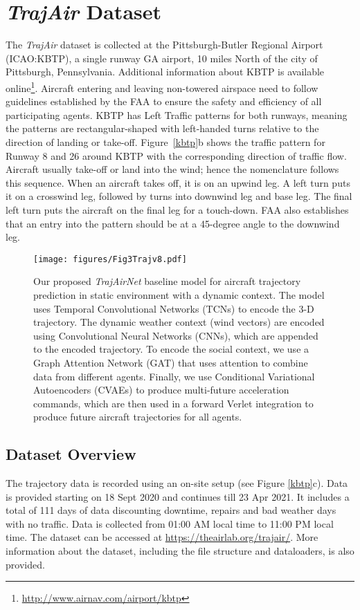 \documentclass[letterpaper, 10 pt, conference]{ieeeconf}
\begin{document}
\section{\textit{TrajAir} Dataset}\label{sec:trajair}




The \textit{TrajAir} dataset is collected at the Pittsburgh-Butler Regional Airport (ICAO:KBTP), a single runway GA airport, 10 miles North of the city of Pittsburgh, Pennsylvania. Additional information about KBTP is available online\footnote{\url{http://www.airnav.com/airport/kbtp}}. Aircraft entering and leaving non-towered airspace need to follow guidelines established by the FAA to ensure the safety and efficiency of all participating agents. KBTP has Left Traffic patterns for both runways, meaning the patterns are rectangular-shaped with left-handed turns relative to the direction of landing or take-off. Figure~\ref{kbtp}b shows the traffic pattern for Runway 8 and 26 around KBTP with the corresponding direction of traffic flow. Aircraft usually take-off or land into the wind; hence the nomenclature follows this sequence. When an aircraft takes off, it is on an upwind leg. A left turn puts it on a crosswind leg, followed by turns into downwind leg and base leg. The final left turn puts the aircraft on the final leg for a touch-down. FAA also establishes that an entry into the pattern should be at a 45-degree angle to the downwind leg.

\begin{figure*}[t]
    \centering
\texttt{[image: figures/Fig3Trajv8.pdf]}

\caption{ Our proposed \textit{TrajAirNet} baseline model for aircraft trajectory prediction in static environment with a dynamic context. The model uses Temporal Convolutional Networks (TCNs) to encode the 3-D trajectory. The dynamic weather context (wind vectors) are encoded using Convolutional Neural Networks (CNNs), which are appended to the encoded trajectory. To encode the social context, we use a Graph Attention Network (GAT) that uses attention to combine data from different agents. Finally, we use Conditional Variational Autoencoders (CVAEs) to produce multi-future acceleration commands, which are then used in a forward Verlet integration to produce future aircraft trajectories for all agents.  }
    \label{fig:TrajAirNetModel}
\end{figure*}       

\subsection{Dataset Overview}
The trajectory data is recorded using an on-site setup (see Figure \ref{kbtp}c). Data is provided starting on 18 Sept 2020 and continues till 23 Apr 2021. It includes a total of 111 days of data discounting downtime, repairs and bad weather days with no traffic. Data is collected from 01:00 AM local time to 11:00 PM local time. The dataset can be accessed at \href{https://theairlab.org/trajair/}{https://theairlab.org/trajair/}. More information about the dataset, including the file structure and dataloaders, is also provided.  
\end{document}

